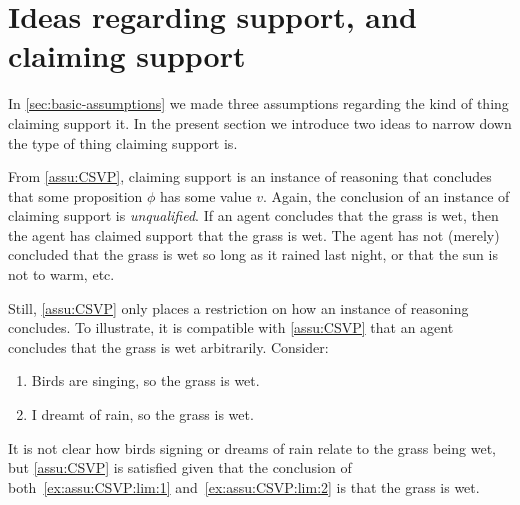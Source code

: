 \section{Ideas regarding support, and claiming support}
\label{sec:two-ideas}

\begin{note}
    In \autoref{sec:basic-assumptions} we made three assumptions regarding the kind of thing claiming support it.
  In the present section we introduce two ideas to narrow down the type of thing claiming support is.
\end{note}

\begin{note}
  From \autoref{assu:CSVP}, claiming support is an instance of reasoning that concludes that some proposition \(\phi\) has some value \(v\).
  Again, the conclusion of an instance of claiming support is \emph{unqualified}.
  If an agent concludes that the grass is wet, then the agent has claimed support that the grass is wet.
  The agent has not (merely) concluded that the grass is wet so long as it rained last night, or that the sun is not to warm, etc.\

  Still, \autoref{assu:CSVP} only places a restriction on how an instance of reasoning concludes.
  To illustrate, it is compatible with \autoref{assu:CSVP} that an agent concludes that the grass is wet arbitrarily.
  Consider:
  \begin{enumerate}
  \item\label{ex:assu:CSVP:lim:1} Birds are singing, so the grass is wet.
  \item\label{ex:assu:CSVP:lim:2} I dreamt of rain, so the grass is wet.
  \end{enumerate}
  It is not clear how birds signing or dreams of rain relate to the grass being wet, but \autoref{assu:CSVP} is satisfied given that the conclusion of both~\ref{ex:assu:CSVP:lim:1} and~\ref{ex:assu:CSVP:lim:2} is that the grass is wet.
\end{note}


